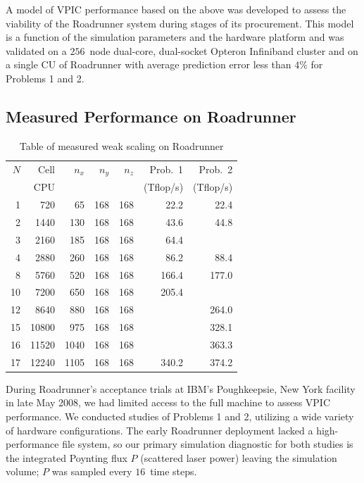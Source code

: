 \documentclass[journal,twoside]{IEEEtran}
\begin{document}
A model of VPIC performance based on the above was developed to assess
the viability of the Roadrunner system during stages of its
procurement.  This model is a function of the simulation parameters
and the hardware platform and was validated on a $256$~node dual-core,
dual-socket Opteron Infiniband cluster and on a single CU of
Roadrunner with average prediction error less than $4\%$ for Problems
1 and 2.

\subsection{Measured Performance on Roadrunner}

\begin{table}
\caption{Table of measured weak scaling on Roadrunner}
\begin{center}
\begin{tabular}{rrrrrrr}
\hline
\hline
$N$ &  Cell & $n_x$ & $n_y$ & $n_z$ &   Prob.~1 &   Prob.~2  \\
    &   CPU &       &       &       & (Tflop/s) & (Tflop/s)  \\
\hline
  1 &   720 &    65 &   168 &   168 &      22.2 &      22.4  \\ 
  2 &  1440 &   130 &   168 &   168 &      43.6 &      44.8  \\
  3 &  2160 &   185 &   168 &   168 &      64.4 &            \\
  4 &  2880 &   260 &   168 &   168 &      86.2 &      88.4  \\
  8 &  5760 &   520 &   168 &   168 &     166.4 &     177.0  \\
 10 &  7200 &   650 &   168 &   168 &     205.4 &            \\
 12 &  8640 &   880 &   168 &   168 &           &     264.0  \\
 15 & 10800 &   975 &   168 &   168 &           &     328.1  \\
 16 & 11520 &  1040 &   168 &   168 &           &     363.3  \\
 17 & 12240 &  1105 &   168 &   168 &     340.2 &     374.2  \\
\hline
\end{tabular}
\end{center}
\label{tbl:weakscaling}
\end{table}

During Roadrunner's acceptance trials at IBM's Poughkeepsie, New York
facility in late May 2008, we had limited access to the full machine
to assess VPIC performance.  We conducted studies of Problems 1 and 2,
utilizing a wide variety of hardware configurations.  The early
Roadrunner deployment lacked a high-performance file system, so our
primary simulation diagnostic for both studies is the integrated
Poynting flux $P$ (scattered laser power) leaving the simulation
volume; $P$ was sampled every $16$~time steps.
\end{document}
